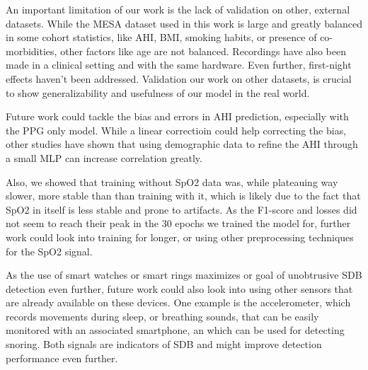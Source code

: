 An important limitation of our work is the lack of validation on other, external datasets. While the MESA dataset used in this work is large and greatly balanced in some cohort statistics, like AHI, BMI, smoking habits, or presence of co-morbidities, other factors like age are not balanced. Recordings have also been made in a clinical setting and with the same hardware. Even further, first-night effects haven't been addressed.
Validation our work on other datasets, is crucial to show generalizability and usefulness of our model in the real world.


Future work could tackle the bias and errors in AHI prediction, especially with the PPG only model. While a linear correctioin could help correcting the bias, other studies have shown that using demographic data to refine the AHI through a small MLP can increase correlation greatly.

Also, we showed that training without SpO2 data was, while plateauing way slower, more stable than than training with it, which is likely due to the fact that SpO2 in itself is less stable and prone to artifacts. As the F1-score and losses did not seem to reach their peak in the 30 epochs we trained the model for, further work could look into training for longer, or using other preprocessing techniques for the SpO2 signal.

As the use of smart watches or smart rings maximizes or goal of unobtrusive SDB detection even further, future work could also look into using other sensors that are already available on these devices. One example is the accelerometer, which records movements during sleep, or breathing sounds, that can be easily monitored with an associated smartphone, an which can be used for detecting snoring. Both signals are indicators of SDB and might improve detection performance even further.
